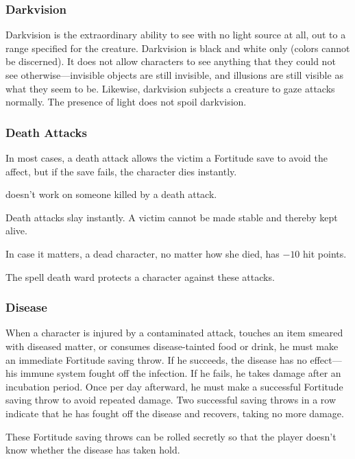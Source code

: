 \subsubsection{Darkvision}
Darkvision is the extraordinary ability to see with no light source at all, out to a range specified for the creature. Darkvision is black and white only (colors cannot be discerned). It does not allow characters to see anything that they could not see otherwise---invisible objects are still invisible, and illusions are still visible as what they seem to be. Likewise, darkvision subjects a creature to gaze attacks normally. The presence of light does not spoil darkvision.

\subsubsection{Death Attacks}
In most cases, a death attack allows the victim a Fortitude save to avoid the affect, but if the save fails, the character dies instantly.

\begin{itemize*}
\item {} doesn't work on someone killed by a death attack.
\item Death attacks slay instantly. A victim cannot be made stable and thereby kept alive.
\item In case it matters, a dead character, no matter how she died, has $-10$ hit points.
\item The spell death ward protects a character against these attacks.
\end{itemize*}

\subsubsection{Disease}
When a character is injured by a contaminated attack, touches an item smeared with diseased matter, or consumes disease-tainted food or drink, he must make an immediate Fortitude saving throw. If he succeeds, the disease has no effect---his immune system fought off the infection. If he fails, he takes damage after an incubation period. Once per day afterward, he must make a successful Fortitude saving throw to avoid repeated damage. Two successful saving throws in a row indicate that he has fought off the disease and recovers, taking no more damage.

These Fortitude saving throws can be rolled secretly so that the player doesn't know whether the disease has taken hold.

